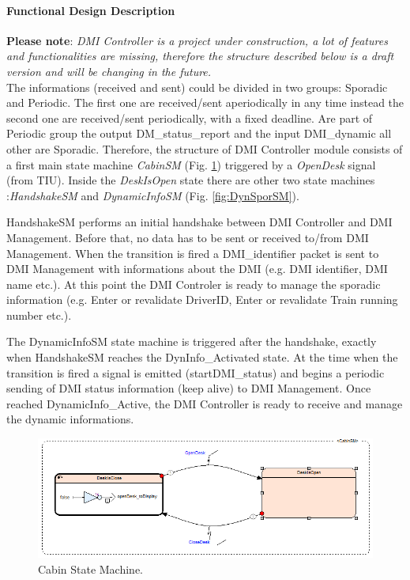 \paragraph{Functional Design Description}
  \textbf{Please note}: \textit{DMI Controller is a project under construction, a lot of features and functionalities are missing, therefore the structure described below is a draft version and will be changing in the future.}\\
  The informations (received and sent) could be divided in two groups: Sporadic and Periodic. The first one are received/sent aperiodically in any time instead the second one are received/sent periodically, with a fixed deadline. Are part of Periodic group the output DM\_status\_report and the input DMI\_dynamic all other are Sporadic. Therefore, the structure of DMI Controller module consists of a first main state machine \textit{CabinSM} (Fig. \ref{fig:CabinSM}) triggered by  a \textit{OpenDesk} signal (from TIU). Inside the \textit{DeskIsOpen} state there are other two state machines :\textit{HandshakeSM} and \textit{DynamicInfoSM} (Fig. \ref{fig:DynSporSM}).
  
  HandshakeSM performs an initial handshake between DMI Controller and DMI Management. Before that, no data has to be sent or received to/from DMI Management. When the transition is fired a DMI\_identifier packet is sent to DMI Management with informations about the DMI (e.g. DMI identifier, DMI name etc.). At this point the DMI Controler is ready to manage the sporadic information (e.g. Enter or revalidate DriverID, Enter or revalidate Train running number etc.). 
  
  The DynamicInfoSM state machine is triggered after the handshake, exactly when  HandshakeSM reaches the  DynInfo\_Activated state. At the time when the transition is fired a signal is emitted (startDMI\_status) and begins a periodic sending of DMI status information (keep alive) to DMI Management. Once reached DynamicInfo\_Active, the DMI Controller is ready to receive and manage the dynamic informations.
  
   \begin{figure} 
      	\centering
      	\includegraphics[scale=0.7]{images/CabinSM}
      	\caption{Cabin State Machine.}
      	\label{fig:CabinSM}
   \end{figure}
      
